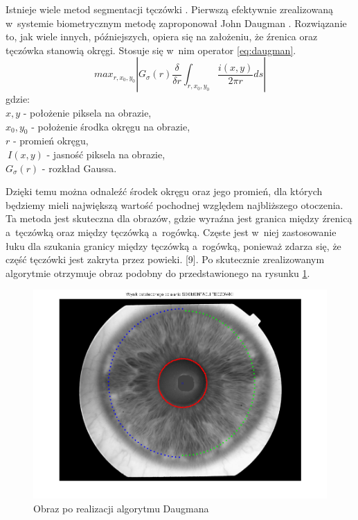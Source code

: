 Istnieje wiele metod segmentacji tęczówki \cite{PrAl06}. Pierwszą efektywnie zrealizowaną w~systemie biometrycznym metodę zaproponował John Daugman \cite{Daugman}. Rozwiązanie to, jak wiele innych, późniejszych, opiera się na założeniu, że źrenica oraz tęczówka stanowią okręgi. Stosuje się w~nim operator \ref{eq:daugman}.
\begin{equation}
\label{eq:daugman}
max_{r,x_{0},y_{0}}\left| G_{\sigma}(r) \frac{\delta}{\delta r}\int_{r,x_{0},y_{0}} \frac{i(x,y)}{2\pi r}ds \right|
\end{equation}
gdzie:\\
$ x,y $ - położenie piksela na obrazie, \\
$ x_{0}, y_{0} $ - położenie środka okręgu na obrazie, \\
$ r $ - promień okręgu, \\
$ ~I(x,y) $ - jasność piksela na obrazie,\\
$ G_{\sigma}(r) $ - rozkład Gaussa.

Dzięki temu można odnaleźć środek okręgu oraz jego promień, dla których będziemy mieli największą wartość pochodnej względem najbliższego otoczenia. Ta metoda jest skuteczna dla obrazów, gdzie wyraźna jest granica między źrenicą a~tęczówką oraz między tęczówką a~rogówką. Częste jest w~niej zastosowanie łuku dla szukania granicy między tęczówką a~rogówką, ponieważ zdarza się, że część tęczówki jest zakryta przez powieki. [9]. Po skutecznie zrealizowanym algorytmie otrzymuje obraz podobny do przedstawionego na rysunku \ref{fig:przykladDaugman}.
\begin{figure}
\begin{center}
\includegraphics[scale=0.5]{calosc.png}
\caption{Obraz po realizacji algorytmu Daugmana}
\label{fig:przykladDaugman}
\end{center}
\end{figure}

